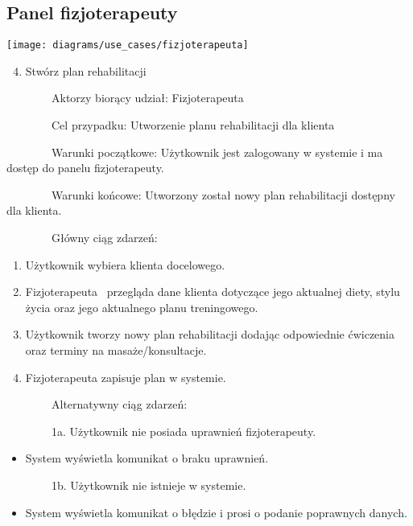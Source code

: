 \subsection{Panel fizjoterapeuty}\label{subsec:panel-fizjoterapeuty}

{\texttt{[image: diagrams/use\_cases/fizjoterapeuta]}}

\begin{enumerate}
\setcounter{enumi}{3}
\tightlist
\item
  {Stwórz plan rehabilitacji}
\end{enumerate}

{~~~~~~~~}{Aktorzy biorący udział: Fizjoterapeuta}

{~~~~~~~~Cel przypadku: Utworzenie planu rehabilitacji dla klienta}

{~~~~~~~~Warunki początkowe: Użytkownik jest zalogowany w systemie i ma
dostęp do panelu fizjoterapeuty.}

{~~~~~~~~Warunki końcowe: Utworzony został nowy plan rehabilitacji
dostępny dla klienta.}

{~~~~~~~~Główny ciąg zdarzeń:}

\begin{enumerate}
\tightlist
\item
  {Użytkownik wybiera klienta docelowego.}
\item
  {Fizjoterapeuta ~przegląda dane klienta dotyczące jego aktualnej
  diety, stylu życia oraz jego aktualnego planu treningowego.}
\item
  {Użytkownik tworzy nowy plan rehabilitacji dodając odpowiednie
  ćwiczenia oraz terminy na masaże/konsultacje.}
\item
  {Fizjoterapeuta zapisuje plan w systemie.}
\end{enumerate}

{~~~~~~~~Alternatywny ciąg zdarzeń:}

{~~~~~~~~1a. Użytkownik nie posiada uprawnień fizjoterapeuty.}

\begin{itemize}
\tightlist
\item
  {System wyświetla komunikat o braku uprawnień.}
\end{itemize}

{~~~~~~~~1b. Użytkownik nie istnieje w systemie.}

\begin{itemize}
\tightlist
\item
  {System wyświetla komunikat o błędzie i prosi o podanie poprawnych
  danych.}
\end{itemize}

